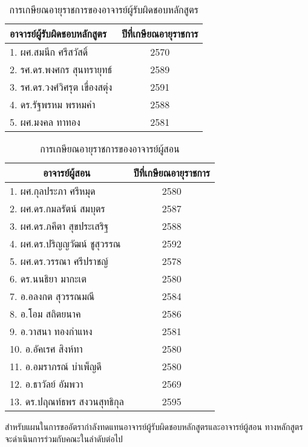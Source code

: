 \begin{longtable}{|l|c|}
	\caption{การเกษียณอายุราชการของอาจารย์ผู้รับผิดชอบหลักสูตร}
	\label{table:5.1-1}
	\\
	\hline
	\textbf{อาจารย์ผู้รับผิดชอบหลักสูตร} & \textbf{ปีที่เกษียณอายุราชการ}\\
	\hline
	1. ผศ.สมนึก ศรีสวัสดิ์ & 2570\\
	2. รศ.ดร.พงศกร สุนทรายุทธ์  &2589 \\ 
	3. รศ.ดร.วงศ์วิศรุต เขื่องสตุ่ง & 2591\\
	4. ดร.รัฐพรหม พรหมคำ  &2588 \\
	5. ผศ.มงคล ทาทอง & 2581\\
	\hline
\end{longtable}
\newpage
\begin{longtable}{|l|c|}
	\caption{การเกษียณอายุราชการของอาจารย์ผู้สอน}
	\label{table:5.1-2}
	\\
	\hline
	\multicolumn{1}{|c|}{\textbf{อาจารย์ผู้สอน}} & \textbf{ปีที่เกษียณอายุราชการ}\\
	\hline
	1. ผศ.กุลประภา ศรีหมุด&2580\\
	2. ผศ.ดร.กมลรัตน์ สมบุตร 	&2587\\
	3. ผศ.ดร.ภคีตา สุขประเสริฐ	& 2588\\
	4. ผศ.ดร.ปริญญวัฒน์ ชูสุวรรณ &2592 \\
	5. ผศ.ดร.วรรณา ศรีปราชญ์	& 2578\\
	6. ดร.นนธิยา มากะเต	& 2580\\
	7. อ.อลงกต สุวรรณมณี	& 2584\\
	8. อ.โอม สถิตยนาค	& 2586\\
	9. อ.วาสนา ทองกำแหง	& 2581\\
	10. อ.อัคเรศ สิงห์ทา	& 2580\\
	11. อ.อมราภรณ์ บำเพ็ญดี	& 2580\\
	12. อ.ธาวัลย์ อัมพวา	& 2569\\
	13. ดร.ปฤณท์ธพร สงวนสุทธิกุล	& 2595\\
	\hline
\end{longtable}

 สำหรับแผนในการขออัตรากำลังทดแทนอาจารย์ผู้รับผิดชอบหลักสูตรและอาจารย์ผู้สอน ทางหลักสูตรจะดำเนินการร่วมกับคณะในลำดับต่อไป


